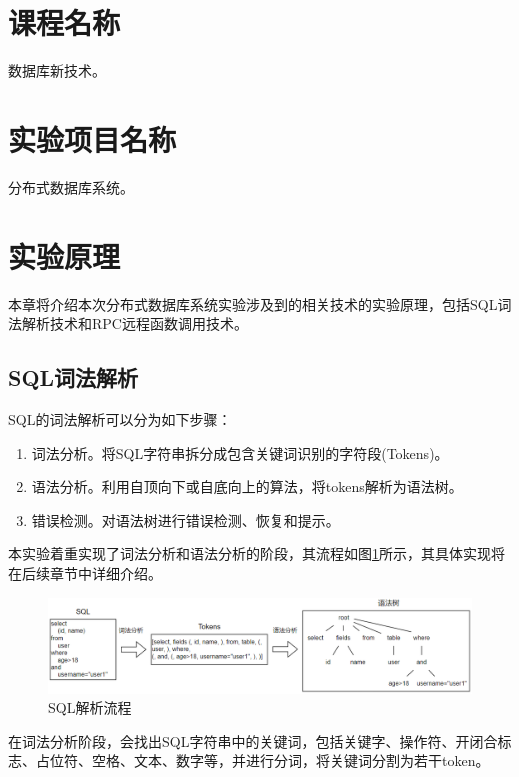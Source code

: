 \section{课程名称}

数据库新技术。

\section{实验项目名称}

分布式数据库系统。

\section{实验原理}

本章将介绍本次分布式数据库系统实验涉及到的相关技术的实验原理，包括SQL词法解析技术和RPC远程函数调用技术。

\subsection{SQL词法解析}

SQL的词法解析可以分为如下步骤：
\begin{enumerate}
    \item 词法分析。将SQL字符串拆分成包含关键词识别的字符段(Tokens)。
    \item 语法分析。利用自顶向下或自底向上的算法，将tokens解析为语法树。
    \item 错误检测。对语法树进行错误检测、恢复和提示。
\end{enumerate}

本实验着重实现了词法分析和语法分析的阶段，其流程如图\ref{fig:sql-parse}所示，其具体实现将在后续章节中详细介绍。

\begin{figure}[H]
    \includegraphics[width=\textwidth]{examples/sql解析流程.png}
    \centering
    \caption{SQL解析流程}
    \label{fig:sql-parse}
\end{figure}

在词法分析阶段，会找出SQL字符串中的关键词，包括关键字、操作符、开闭合标志、占位符、空格、文本、数字等，并进行分词，将关键词分割为若干token。

